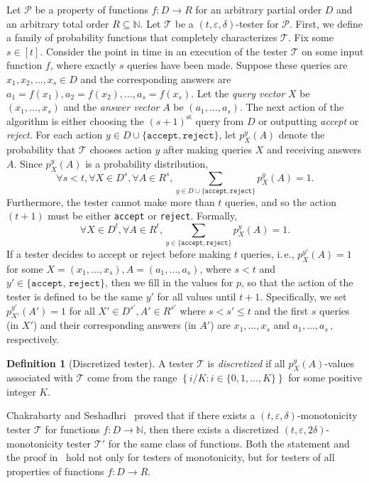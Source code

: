 \documentclass[11pt]{article}
\numberwithin{equation}{section}
\theoremstyle{definition}
\newtheorem{definition}[theorem]{Definition}
\theoremstyle{plain}
\newcommand{\N}{\mathbb N}
\newcommand{\ie}{i.\,e.}
\newcommand{\eps}{\varepsilon}
\newcommand{\cP}{\ensuremath{\mathcal{P}}}
\newcommand{\cT}{\ensuremath{\mathcal{T}}}
\begin{document}
Let $\cP$ be a property of functions $f:D \to R$ for an arbitrary partial order $D$ and an arbitrary total order $R \subseteq \N$. Let $\cT$ be a $(t,\eps,\delta)$-tester for $\cP$. First, we define a family of probability functions that completely characterizes $\cT$. Fix some $s \in [t]$. Consider the point in time in an execution of the tester $\cT$ on some input function $f$, where exactly $s$ queries have been made.
Suppose these queries are $x_1, x_2, \ldots, x_s \in D$ and the corresponding answers are $a_1=f(x_1), a_2=f(x_2), \ldots, a_s=f(x_s)$.
Let the \emph{query vector} $X$ be $(x_1, \ldots, x_s)$ and the \emph{answer vector} $A$ be $(a_1, \ldots, a_s)$. The next action of the algorithm is either choosing the ${(s+1)}^\text{st}$ query from $D$ or outputting \emph{accept} or \emph{reject}. For each action $y \in D \cup \{\texttt{accept}, \texttt{reject}\}$, let $p_X^y(A)$ denote the probability that $\cT$ chooses action $y$ after making queries $X$ and receiving answers $A$. Since $p_X^y(A)$ is a probability distribution,
\[\forall s < t, \forall X \in D^s, \forall A \in R^s, \sum_{y \in D \cup \{\texttt{accept}, \texttt{reject} \}} p_X^y(A) = 1.\]
%
Furthermore, the tester cannot make more than $t$ queries,
and so the action $(t+1)$ must be either \texttt{accept} or \texttt{reject}. Formally,
\[\forall X \in D^t, \forall A \in R^t, \sum_{y \in \{\texttt{accept}, \texttt{reject} \}} p_X^y(A) = 1.\]
%
If a tester decides to accept or reject before making $t$ queries, \ie, $p_X^{y'}(A) = 1$ for some $X = (x_1, \ldots, x_s), A=(a_1, \ldots, a_s)$, where $s < t$ and $y' \in \{\texttt{accept, reject}\}$, then
we fill in the values for $p$, so that the action of the tester is defined to be the same $y'$ for all values until $t+1$. Specifically,
 we set $p_{X'}^{y'}(A') = 1$
for all $X' \in D^{s'}, A' \in R^{s'}$ where $s < s' \leq t$ and the first $s$ queries (in $X'$) and their corresponding answers (in $A'$) are $x_1, \ldots, x_s$ and 
$a_1, \ldots, a_s$\,, %
respectively.  %

\begin{definition} [Discretized tester] \label{def:disc}
A tester $\cT$ is \emph{discretized} if all $p_X^y(A)$-values associated with $\cT$ come from the range $\left\{ {i}/{K}: i\in \{0,1,\ldots,K\} \right\}$ for some positive integer $K$.
\end{definition}

Chakrabarty and Seshadhri~\cite{CS14} proved that if there exists a $(t,\eps,\delta)$-monotonicity tester $\cT$ for functions $f:D \to \N$, then there exists a discretized $(t,\eps,2\delta)$-monotonicity tester $\cT'$ for the same class of functions.
Both the statement and the proof in~\cite{CS14} hold not only for testers of monotonicity, but for testers of all properties of functions $f:D \to R$.
\end{document}
